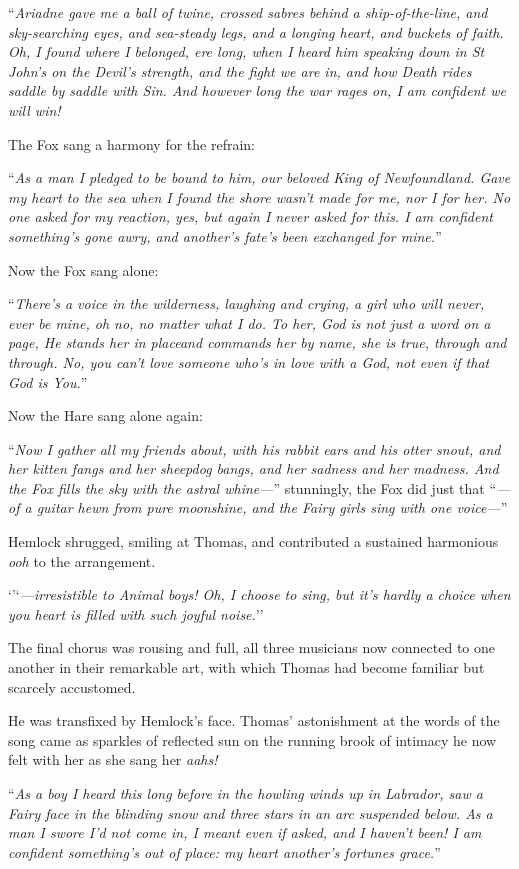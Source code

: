 \documentclass[11pt,a5paper]{article}
\begin{document}
``\emph{Ariadne gave me a ball of twine, crossed sabres behind a ship-of-the-line, and sky-searching eyes, and sea-steady legs, and a longing heart, and buckets of faith. Oh, I found where I belonged, ere long, when I heard him speaking down in St John's on the Devil's strength, and the fight we are in, and how Death rides saddle by saddle with Sin. And however long the war rages on, I am confident we will win!}

The Fox sang a harmony for the refrain:

``\emph{As a man I pledged to be bound to him, our beloved King of Newfoundland. Gave my heart to the sea when I found the shore wasn't made for me, nor I for her. No one asked for my reaction, yes, but again I never asked for this. I am confident something's gone awry, and another's fate's been exchanged for mine.}''

Now the Fox sang alone:

``\emph{There's a voice in the wilderness, laughing and crying, a girl who will never, ever be mine, oh no, no matter what I do. To her, God is not just a word on a page, He stands her in placeand commands her by name, she is true, through and through. No, you can't love someone who's in love with a God, not even if that God is You.}''

Now the Hare sang alone again:

``\emph{Now I gather all my friends about, with his rabbit ears and his otter snout, and her kitten fangs and her sheepdog bangs, and her sadness and her madness. And the Fox fills the sky with the astral whine---}'' stunningly, the Fox did just that ``\emph{---of a guitar hewn from pure moonshine, and the Fairy girls sing with one voice---}''

Hemlock shrugged, smiling at Thomas, and contributed a sustained harmonious \emph{ooh} to the arrangement.

`'`\emph{---irresistible to Animal boys! Oh, I choose to sing, but it's hardly a choice when you heart is filled with such joyful noise.}''

The final chorus was rousing and full, all three musicians now connected to one another in their remarkable art, with which Thomas had become familiar but scarcely accustomed.

He was transfixed by Hemlock's face. Thomas' astonishment at the words of the song came as sparkles of reflected sun on the running brook of intimacy he now felt with her as she sang her \emph{aahs!}

``\emph{As a boy I heard this long before in the howling winds up in Labrador, saw a Fairy face in the blinding snow and three stars in an arc suspended below. As a man I swore I'd not come in, I meant even if asked, and I haven't been! I am confident something's out of place: my heart another's fortunes grace.}''
\end{document}
